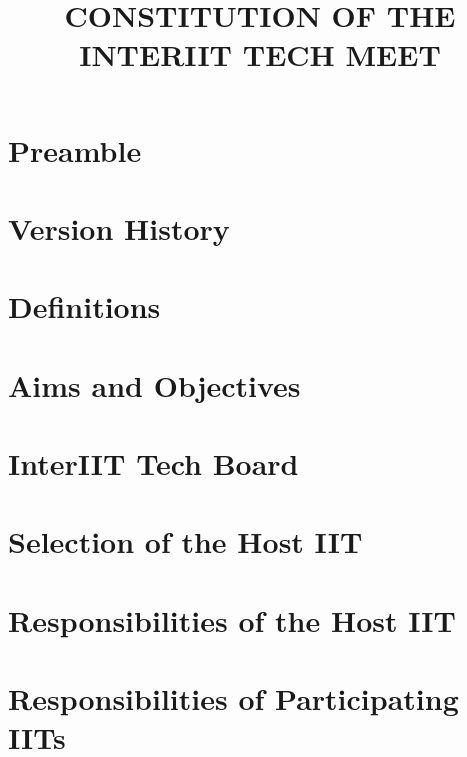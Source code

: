 \documentclass[letterpaper,12pt,titlepage]{article}
\title{\Huge{\uppercase{\textbf{Constitution of the InterIIT Tech Meet}}}}
\date{}
\begin{document}

\begin{titlepage}
\maketitle
\end{titlepage}


\thispagestyle{empty}

\tableofcontents
\clearpage

\section{Preamble}


\newpage
\section{Version History}


\newpage
\section{Definitions}


\newpage
\section{Aims and Objectives}


\newpage
\section{InterIIT Tech Board}


\newpage
\section{Selection of the Host IIT}


\newpage
\section{Responsibilities of the Host IIT}


\newpage
\section{Responsibilities of Participating IITs}

\end{document}
